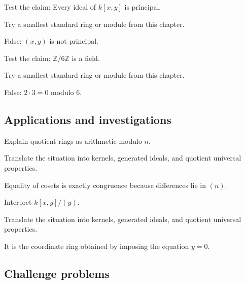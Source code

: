 \begin{exercise}\label{exr:v01-expand-11}
Test the claim: Every ideal of $k[x,y]$ is principal.
\end{exercise}
\begin{hint}
Try a smallest standard ring or module from this chapter.
\end{hint}
\begin{solution}
False: $(x,y)$ is not principal.
\end{solution}

\begin{exercise}\label{exr:v01-expand-12}
Test the claim: $\mathbb Z/6\mathbb Z$ is a field.
\end{exercise}
\begin{hint}
Try a smallest standard ring or module from this chapter.
\end{hint}
\begin{solution}
False: $2\cdot3=0$ modulo $6$.
\end{solution}

\subsection*{Applications and investigations}

\begin{exercise}\label{exr:v01-expand-13}
Explain quotient rings as arithmetic modulo $n$.
\end{exercise}
\begin{hint}
Translate the situation into kernels, generated ideals, and quotient universal properties.
\end{hint}
\begin{solution}
Equality of cosets is exactly congruence because differences lie in $(n)$.
\end{solution}

\begin{exercise}\label{exr:v01-expand-14}
Interpret $k[x,y]/(y)$.
\end{exercise}
\begin{hint}
Translate the situation into kernels, generated ideals, and quotient universal properties.
\end{hint}
\begin{solution}
It is the coordinate ring obtained by imposing the equation $y=0$.
\end{solution}

\subsection*{Challenge problems}

